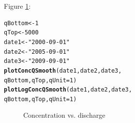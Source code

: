 \documentclass[a4paper,11pt]{article}\usepackage{graphicx, color}
\makeatletter
\newcommand{\hlfunctioncall}[1]{\textcolor[rgb]{0.501960784313725,0,0.329411764705882}{\textbf{#1}}}%
\newcommand{\hlstring}[1]{\textcolor[rgb]{0.6,0.6,1}{#1}}%
\newenvironment{kframe}{%
 \def\at@end@of@kframe{}%
 \ifinner\ifhmode%
  \def\at@end@of@kframe{\end{minipage}}%
  \begin{minipage}{\columnwidth}%
 \fi\fi%
 \def\FrameCommand##1{\hskip\@totalleftmargin \hskip-\fboxsep
 \colorbox{shadecolor}{##1}\hskip-\fboxsep
     \hskip-\linewidth \hskip-\@totalleftmargin \hskip\columnwidth}%
 \MakeFramed {\advance\hsize-\width
   \@totalleftmargin\z@ \linewidth\hsize
   \@setminipage}}%
 {\par\unskip\endMakeFramed%
 \at@end@of@kframe}
\newenvironment{knitrout}{}{} %
\makeatother
\begin{document}
Figure \ref{fig:plotLogConcQSmooth}:
\begin{knitrout}
\color{fgcolor}\begin{kframe}
\begin{alltt}
qBottom<-1
qTop<-5000
date1 <- \hlstring{"2000-09-01"}
date2 <- \hlstring{"2005-09-01"}
date3 <- \hlstring{"2009-09-01"}
\hlfunctioncall{plotConcQSmooth}(date1, date2, date3,
                qBottom, qTop, qUnit=1)
\hlfunctioncall{plotLogConcQSmooth}(date1, date2, date3,
                   qBottom, qTop, qUnit=1)
\end{alltt}
\end{kframe}\begin{figure}[]
\caption[Concentration vs]{Concentration vs. discharge\label{fig:plotLogConcQSmooth}}
\end{figure}


\end{knitrout}
\end{document}
